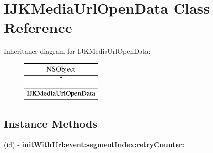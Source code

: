 \hypertarget{interface_i_j_k_media_url_open_data}{}\section{I\+J\+K\+Media\+Url\+Open\+Data Class Reference}
\label{interface_i_j_k_media_url_open_data}
Inheritance diagram for I\+J\+K\+Media\+Url\+Open\+Data\+:\begin{figure}[H]
\begin{center}
\leavevmode
\includegraphics[height=2.000000cm]{interface_i_j_k_media_url_open_data}
\end{center}
\end{figure}
\subsection*{Instance Methods}
\begin{DoxyCompactItemize}
\item 
\mbox{\label{interface_i_j_k_media_url_open_data_aebc5e26eeee34eaeb6ce7355c57674e4}} 
(id) -\/ {\bfseries init\+With\+Url\+:event\+:segment\+Index\+:retry\+Counter\+:}
\end{DoxyCompactItemize}
